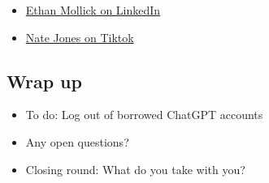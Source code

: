 \documentclass[
  letterpaper,
  DIV=11,
  numbers=noendperiod]{scrartcl}
\providecommand{\tightlist}{%
  \setlength{\itemsep}{0pt}\setlength{\parskip}{0pt}}\usepackage{longtable,booktabs,array}
\begin{document}
\begin{itemize}
\tightlist
\item
  \href{https://www.linkedin.com/in/emollick/}{Ethan Mollick on
  LinkedIn}
\item
  \href{https://www.tiktok.com/@nate.b.jones}{Nate Jones on Tiktok}
\end{itemize}

\subsection{Wrap up}\label{wrap-up}

\begin{itemize}
\tightlist
\item
  To do: Log out of borrowed ChatGPT accounts
\item
  Any open questions?
\item
  Closing round: What do you take with you?
\end{itemize}
\end{document}
